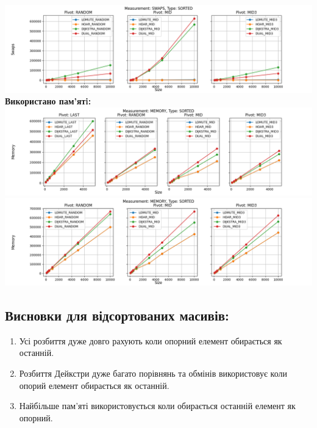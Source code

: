 \documentclass{article}
\begin{document}
        \includegraphics[scale=0.5]{sorted_Swaps_3_pivots_7_numbers.png}
        \newline
    \newpage
    \textbf{Використано пам’ятi:}
    \newline
        \includegraphics[scale=0.5]{sorted_Memory_6_numbers.png}
        \includegraphics[scale=0.5]{sorted_Memory_3_pivots_7_numbers.png}
    \subsection{Висновки для відсортованих масивів:}
    \begin{enumerate}
        \item Усі розбиття дуже довго рахують коли опорний елемент обирається як останній.
        \item Розбиття Дейкстри дуже багато порівнянь та обмінів використовує коли опорий елемент обирається як останній.
        \item Найбільше пам'яті використовується коли обирається останній елемент як опорний.
    \end{enumerate}
    \newpage

\end{document}
